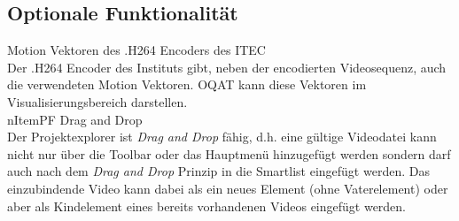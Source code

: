 \subsection{Optionale Funktionalität}
 Motion Vektoren des .H264 Encoders des \gls{ITEC}\\
Der .H264 Encoder des Instituts gibt, neben der encodierten Videosequenz, auch die verwendeten Motion
Vektoren. \gls{OQAT} kann diese Vektoren im Visualisierungsbereich darstellen.\\
nItem{PF} Drag and Drop\\
Der Projektexplorer ist \emph{Drag and Drop} fähig, d.h. eine gültige Videodatei kann nicht nur über
die Toolbar oder das Hauptmenü hinzugefügt werden sondern darf auch nach dem \emph{Drag and Drop} Prinzip
in die Smartlist eingefügt werden. Das einzubindende Video kann dabei als ein neues Element (ohne
Vaterelement) oder aber als Kindelement eines bereits vorhandenen Videos eingefügt werden.
%


